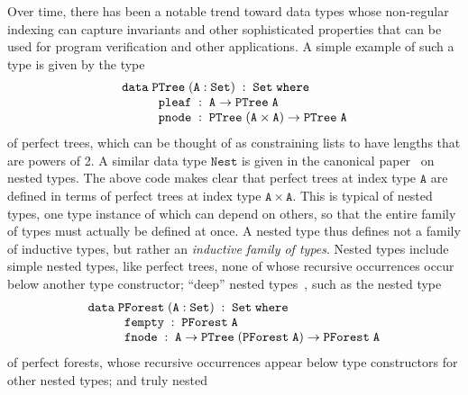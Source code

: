 \documentclass{lmcs}
\theoremstyle{plain}\newtheorem{satz}[thm]{Satz}
\begin{document}
Over time, there has been a notable trend toward data types whose
non-regular indexing can capture invariants and other sophisticated
properties that can be used for program verification and other
applications.  A simple example of such a type is given by the type 
\[\begin{array}{l}
\mathtt{data\; PTree\;(A : Set)\;:\;Set\;where}\\
\hspace*{0.4in}\mathtt{pleaf\;:\;A \rightarrow PTree\;A}\\
\hspace*{0.4in}\mathtt{pnode\;:\;PTree\;(A \times A) \rightarrow PTree\;A}
\end{array}\]
\noindent
of perfect trees, which can be thought of as constraining lists to
have lengths that are powers of 2.  A similar data type
$\mathtt{Nest}$ is given in the canonical paper~\cite{bm98} on nested
types. The above code makes clear that perfect trees at index type
$\mathtt{A}$ are defined in terms of perfect trees at index type
$\mathtt{A \times A}$. This is typical of nested types, one type
instance of which can depend on others, so that the entire family of
types must actually be defined at once. A nested type thus defines not
a family of inductive types, but rather an {\em inductive family of
  types}.  Nested types include simple nested types, like perfect
trees, none of whose recursive occurrences occur below another type
constructor; ``deep'' nested types~\cite{jp20}, such as the nested
type
\[\begin{array}{l}
\mathtt{data\; PForest\;(A : Set)\;:\;Set\;where}\\
\hspace*{0.4in}\mathtt{fempty\;:\;PForest\;A}\\
\hspace*{0.4in}\mathtt{fnode\;:\; A \rightarrow PTree\;(PForest\;A) \to
PForest\;A}
\end{array}\]
\hspace{-0.04in}of perfect forests, whose recursive occurrences appear
below type constructors for other nested types; and truly nested
\end{document}
